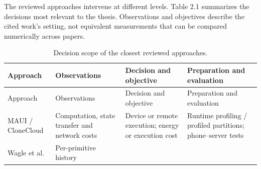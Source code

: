 \documentclass[14pt,a4paper,oneside]{extreport}
\begin{document}
The reviewed approaches intervene at different levels. Table 2.1 summarizes the decisions most
relevant to the thesis. Observations and objectives describe the cited work's setting, not
equivalent measurements that can be compared numerically across papers.

\begin{longtable}{|
  >{\raggedright\arraybackslash}p{}|
  >{\raggedright\arraybackslash}p{}|
  >{\raggedright\arraybackslash}p{}|
  >{\raggedright\arraybackslash}p{}|}
\caption{Decision scope of the closest reviewed approaches.}\tabularnewline
\hline
\begin{minipage}[b]{\linewidth}\raggedright
Approach
\end{minipage} & \begin{minipage}[b]{\linewidth}\raggedright
Observations
\end{minipage} & \begin{minipage}[b]{\linewidth}\raggedright
Decision and objective
\end{minipage} & \begin{minipage}[b]{\linewidth}\raggedright
Preparation and evaluation
\end{minipage} \\
\hline
\endfirsthead
\hline
\begin{minipage}[b]{\linewidth}\raggedright
Approach
\end{minipage} & \begin{minipage}[b]{\linewidth}\raggedright
Observations
\end{minipage} & \begin{minipage}[b]{\linewidth}\raggedright
Decision and objective
\end{minipage} & \begin{minipage}[b]{\linewidth}\raggedright
Preparation and evaluation
\end{minipage} \\
\hline
\endhead
\hline
\endlastfoot
  MAUI / CloneCloud \citep{maui2010, clonecloud2011}
    & Computation, state transfer and network costs
    & Device or remote execution; energy or execution cost
    & Runtime profiling / profiled partitions; phone--server tests
    \\ \hline
%
  Wagle et al. \citep{wagle2019}
    & Per-primitive history

\end{longtable}
\end{document}
